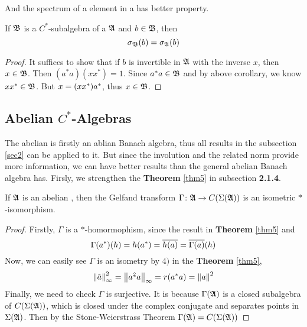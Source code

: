 \documentclass[a4paper,11pt]{report}
\begin{document}
And the spectrum of a element in a \Cs has better property.

\begin{thm}
	If $\mathfrak{B}$ is a $C^{*}$-subalgebra of a \Cs $\mathfrak{A}$ and $b \in \mathfrak{B}$, then
	\begin{equation*}
		\sigma_{\mathfrak{B}}(b) = \sigma_{\mathfrak{A}}(b)
	\end{equation*}
\end{thm} 
\begin{proof}
	It suffices to show that if $b$ is invertible in $\mathfrak{A}$ with the inverse $x$, then $x \in \mathfrak{B}$. Then $(a^{*}a)(xx^{*})=1$. Since $a^{*}a \in \mathfrak{B}$ and by above corollary, we know $xx^{*} \in \mathfrak{B}$. But $x = (xx^{*})a^{*}$, thus $x \in \mathfrak{B}$.
\end{proof}

\subsection{Abelian \texorpdfstring{$C^{*}$-Algebras}{C*-Algebras}}

The abelian \Cs is firstly an ablian Banach algebra, thus all results in the subsection \ref{sec2} can be applied to it. But since the involution and the related norm provide more information, we can have better results than the general abelian Banach algebra has. Firsly, we strengthen the \textbf{Theorem} \ref{thm5} in subsection \textbf{2.1.4}.

\begin{thm}
	If $\mathfrak{A}$ is an abelian \Cs, then the Gelfand transform $\Gamma \colon \mathfrak{A} \rightarrow C(\Sigma(\mathfrak{A}))$ is an isometric $*$-isomorphism.
\end{thm}
\begin{proof}
	Firstly, $\Gamma$ is a $*$-homormophism, since the result in \textbf{Theorem} \ref{thm5} and
	\begin{equation*}
		\Gamma(a^{*})(h) = h(a^{*}) = \overline{h(a)} = \overline{\Gamma(a)}(h)
	\end{equation*}
	Now, we can easily see $\Gamma$ is an isometry by $4)$ in the \textbf{Theorem} \ref{thm5},
	\begin{equation*}
		\left\lVert\hat{a}\right\lVert_{\infty}^{2} = \left\lVert\hat{a^{*}a}\right\lVert_{\infty} = r(a^{*}a) = \left\lVert a\right\lVert^2
	\end{equation*}
	Finally, we need to check $\Gamma$ is surjective. It is because $\Gamma(\mathfrak{A})$ is a closed subalgebra of $C(\Sigma(\mathfrak{A}))$, which is closed under the complex conjugate and separates points in $\Sigma(\mathfrak{A})$. Then by the Stone-Weierstrass Theorem $\Gamma(\mathfrak{A})=C(\Sigma(\mathfrak{A}))$
\end{proof}
\end{document}
